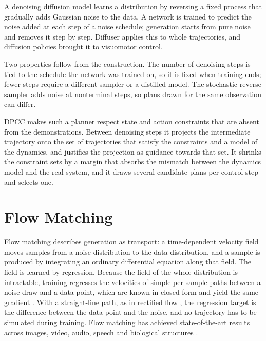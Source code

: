\documentclass[headsepline,footsepline,footinclude=false,oneside,fontsize=11pt,paper=a4,listof=totoc,bibliography=totoc]{scrbook}
\theoremstyle{definition}
\theoremstyle{plain}
\theoremstyle{remark}
\begin{document}
A denoising diffusion model \parencite{sohl2015deep,ho2020denoising} learns a distribution by
reversing a fixed process that gradually adds Gaussian noise to the data. A network is trained to
predict the noise added at each step of a noise schedule; generation starts from pure noise and
removes it step by step. Diffuser \parencite{janner2022planning} applies this to whole trajectories,
and diffusion policies \parencite{chi2023diffusion} brought it to visuomotor control.

Two properties follow from the construction. The number of denoising steps is tied to the schedule
the network was trained on, so it is fixed when training ends; fewer steps require a different sampler
\parencite{song2021denoising} or a distilled model. The stochastic reverse sampler adds noise at nonterminal steps, so plans drawn
for the same observation can differ.

\ac{DPCC} \parencite{romer2025diffusion} makes such a planner respect state and action constraints
that are absent from the demonstrations. Between denoising steps it projects the intermediate
trajectory onto the set of trajectories that satisfy the constraints and a model of the dynamics, and
justifies the projection as guidance towards that set. It shrinks the constraint sets by a margin that
absorbs the mismatch between the dynamics model and the real system, and it draws several candidate
plans per control step and selects one.

\section{Flow Matching}\label{sec:bg:fm}

Flow matching \parencite{lipman2023flow,lipman2024guide} describes generation as transport: a
time-dependent velocity field moves samples from a noise distribution to the data distribution, and a
sample is produced by integrating an ordinary differential equation along that field. The field is
learned by regression. Because the field of the whole distribution is intractable, training regresses
the velocities of simple per-sample paths between a noise draw and a data point, which are known in
closed form and yield the same gradient \parencite{lipman2023flow}. With a straight-line path, as in
rectified flow \parencite{liu2023flow}, the regression target is the difference between the data point
and the noise, and no trajectory has to be simulated during training. Flow matching has achieved
state-of-the-art results across images, video, audio, speech and biological structures
\parencite{lipman2024guide}.
\end{document}
